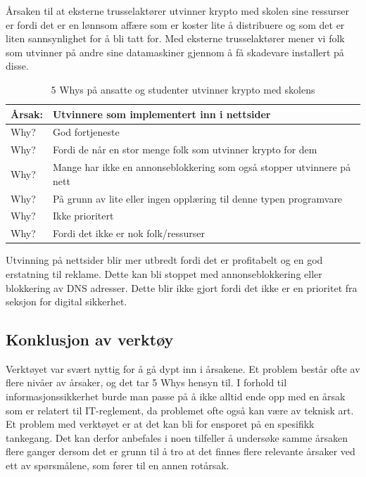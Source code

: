 Årsaken til at eksterne trusselaktører utvinner krypto med skolen sine ressurser er fordi det er en lønnsom affære som er koster lite å distribuere og som det er liten sannsynlighet for å bli tatt for. Med eksterne trusselaktører mener vi folk som utvinner på andre sine datamaskiner gjennom å få skadevare installert på disse.

\begin{table} [H]
    \centering
    \begin{tabular}{ | m{5em} | m{30em} | }
        \hline
            \cellcolor{yellow} Årsak: & \cellcolor{yellow} Utvinnere som implementert inn i nettsider              \\
        \hline
            Why? & God fortjeneste                                   \\
        \hline
            Why? & Fordi de når en stor menge folk som utvinner krypto for dem                                           \\
        \hline
            Why? & Mange har ikke en annonseblokkering som også stopper utvinnere på nett               \\
        \hline
            Why? & På grunn av lite eller ingen opplæring til denne typen programvare           \\
        \hline
            Why? & Ikke prioritert    \\
        \hline
            Why? & Fordi det ikke er nok folk/ressurser    \\
        \hline
    \end{tabular}
    \caption[5 Whys: Minere som er implementert inn i nettsider]{5 Whys på ansatte og studenter utvinner krypto med skolens}
    \label{5Whys-minere}
\end{table}
Utvinning på nettsider blir mer utbredt fordi det er profitabelt og en god erstatning til reklame. Dette kan bli stoppet med annonseblokkering eller blokkering av DNS adresser. Dette blir ikke gjort fordi det ikke er en prioritet fra seksjon for digital sikkerhet.


\subsection{Konklusjon av verktøy}
Verktøyet var svært nyttig for å gå dypt inn i årsakene. Et problem består ofte av flere nivåer av årsaker, og det tar 5 Whys hensyn til. I forhold til informasjonssikkerhet burde man passe på å ikke alltid ende opp med en årsak som er relatert til IT-reglement, da problemet ofte også kan være av teknisk art. Et problem med verktøyet er at det kan bli for ensporet på en spesifikk tankegang. Det kan derfor anbefales i noen tilfeller å undersøke samme årsaken flere ganger dersom det er grunn til å tro at det finnes flere relevante årsaker ved ett av spørsmålene, som fører til en annen rotårsak.

